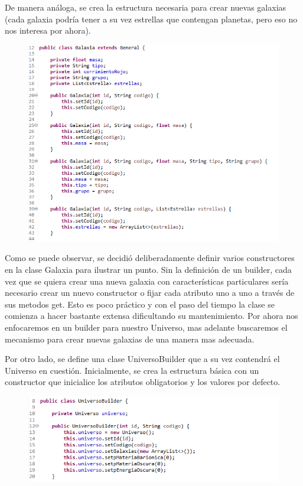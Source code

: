 De manera análoga, se crea la estructura necesaria para crear nuevas galaxias (cada galaxia podría tener a su vez estrellas que contengan planetas, pero eso no nos interesa por ahora).

\begin{figure}[H]
	\includegraphics{images/creational/builder/builderExample3.png}
\end{figure}

 Como se puede observar, se decidió deliberadamente definir varios constructores en la clase Galaxia para ilustrar un punto. Sin la definición de un builder, cada vez que se quiera crear una nueva galaxia con características particulares sería necesario crear un nuevo constructor o fijar cada atributo uno a uno a través de sus metodos get. Esto es poco práctico y con el paso del tiempo la clase se comienza a hacer bastante extensa dificultando su mantenimiento. Por ahora nos enfocaremos en un builder para nuestro Universo, mas adelante buscaremos el mecanismo para crear nuevas galaxias de una manera mas adecuada.
 
 Por otro lado, se define una clase UniversoBuilder que a su vez contendrá el Universo en cuestión. Inicialmente, se crea la estructura básica con un constructor que inicialice los atributos obligatorios y los valores por defecto.
 
 \begin{figure}[H]
	\includegraphics{images/creational/builder/builderExample4.png}
\end{figure}
 
